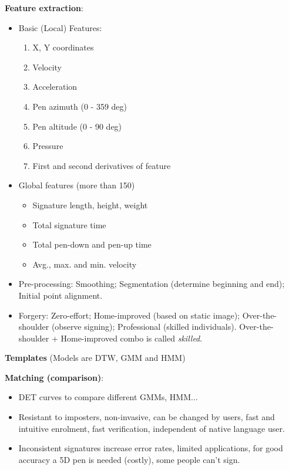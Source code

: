 \documentclass[a4paper]{article}
\begin{document}
      \textbf{Feature extraction}:
      \begin{itemize}
        \item Basic (Local) Features:
        \begin{enumerate}
          \item X, Y coordinates
          \item Velocity
          \item Acceleration
          \item Pen azimuth (0 - 359 deg)
          \item Pen altitude (0 - 90 deg)
          \item Pressure
          \item First and second derivatives of feature
        \end{enumerate}
        \item Global features (more than 150)
        \begin{itemize}
          \item Signature length, height, weight
          \item Total signature time
          \item Total pen-down and pen-up time
          \item Avg., max. and min. velocity
        \end{itemize}
        \item Pre-processing: Smoothing; Segmentation (determine beginning and end); Initial point alignment.
        \item Forgery: Zero-effort; Home-improved (based on static image); Over-the-shoulder (observe signing); Professional (skilled individuals). Over-the-shoulder + Home-improved combo is called \emph{skilled}.
      \end{itemize}

      \textbf{Templates} (Models are DTW, GMM and HMM)

      \textbf{Matching (comparison)}:
      \begin{itemize}
        \item DET curves to compare different GMMs, HMM...
        \item Resistant to imposters, non-invasive, can be changed by users, fast and intuitive enrolment, fast verification, independent of native language user.
        \item Inconsistent signatures increase error rates, limited applications, for good accuracy a 5D pen is needed (costly), some people can't sign.
      \end{itemize}
\end{document}
